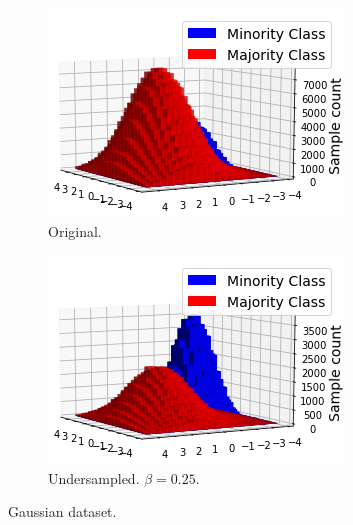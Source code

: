 \documentclass[conference]{IEEEtran}
\begin{document}
			\begin{figure}
			     \centering
			     \begin{subfigure}[b]{0.24\textwidth}
			         \centering
			         \includegraphics[width=\textwidth]{Undersampling_2D_OriginalDataset}
			         \caption{Original.}
			         \label{fig:Undersampling_2D_OriginalDataset}
			     \end{subfigure}
			     \hfill
			     \begin{subfigure}[b]{0.24\textwidth}
			         \centering
			         \includegraphics[width=\textwidth]{Undersampling_2D_UndersampledDataset}
			         \caption{Undersampled. $\beta=0.25$.}
			         \label{fig:Undersampling_2D_UndersampledDataset}
			     \end{subfigure}
			        \caption{Gaussian dataset.}
			        \label{fig:Undersampling_2D_OriginalHistograms}
			\end{figure}
\end{document}
